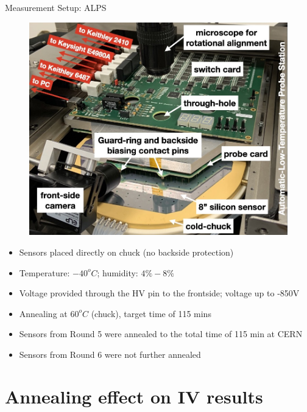 \documentclass{beamer}
\begin{document}
\begin{frame}{Measurement Setup: ALPS}
    \begin{figure}
        \includegraphics[width=.45\textwidth]{plots/ALPS_setup.png}
    \end{figure}
  
    \begin{itemize}
        \scriptsize
        \item Sensors placed directly on chuck (no backside protection)
        \item Temperature: $-40^oC$; humidity: $ 4\% - 8\%$
        \item Voltage provided through the HV pin to the frontside;  voltage up to \alert{-850V}
        \item Annealing at $60^oC$ (chuck), target time of 115 mins
        \item Sensors from Round 5 were annealed to the total time of 115 min at CERN 
        \item Sensors from Round 6 were not further annealed
    \end{itemize}
\end{frame}
  

\section{Annealing effect on IV results}
\end{document}
